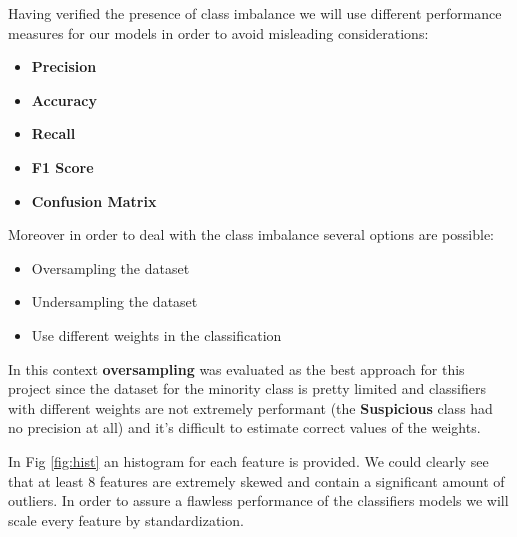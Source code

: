 \documentclass[a4paper,12pt]{article}
\begin{document}
\noindent Having verified the presence of class imbalance we will use different performance measures for our models in order to avoid misleading considerations:
\bigbreak
\begin{itemize}
  \item \textbf{Precision}
  \item \textbf{Accuracy} 
  \item \textbf{Recall}
  \item \textbf{F1 Score}
  \item \textbf{Confusion Matrix}
\end{itemize}

\bigbreak
\noindent
Moreover in order to deal with the class imbalance several options are possible:
\begin{itemize}
  \item Oversampling the dataset 
  \item Undersampling the dataset
  \item Use different weights in the classification
\end{itemize}
\bigbreak
\noindent In this context \textbf{oversampling} was evaluated as the best approach for this project since the dataset for the minority class is pretty limited and classifiers with different weights are not extremely performant (the \textbf{Suspicious} class had no precision at all) and it's difficult to estimate correct values of the weights.

\bigbreak
\noindent In Fig \ref{fig:hist} an histogram for each feature is provided. We could clearly see that at least 8 features are extremely skewed and contain a significant amount of outliers. In order to assure a flawless performance of the classifiers models we will scale every feature by standardization.
\end{document}
